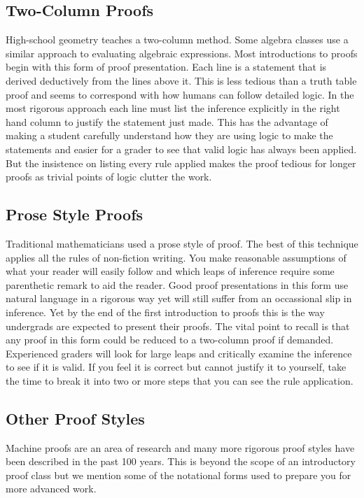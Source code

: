 \documentclass[11pt]{book} %
\theoremstyle {definition}
\theoremstyle {remark}
\begin{document}
  \subsection{Two-Column Proofs}
High-school geometry teaches a two-column method. Some algebra classes use a similar approach to evaluating algebraic expressions. Most introductions to proofs begin with this form of proof presentation. Each line is a statement that is derived deductively from the lines above it. This is less tedious than a truth table proof and seems to correspond with how humans can follow detailed logic. In the most rigorous approach each line must list the inference explicitly in the right hand column to justify the statement just made. This has the advantage of making a student carefully understand how they are using logic to make the statements and easier for a grader to see that valid logic has always been applied. But the insistence on listing every rule applied makes the proof tedious for longer proofs as trivial points of logic clutter the work.
  \subsection{Prose Style Proofs}
Traditional mathematicians used a prose style of proof. The best of this technique applies all the rules of non-fiction writing. You make reasonable assumptions of what your reader will easily follow and which leaps of inference require some parenthetic remark to aid the reader. Good proof presentations in this form use natural language in a rigorous way yet will still suffer from an occassional slip  in inference. Yet by the end of the first introduction to proofs this is the way undergrads are expected to present their proofs. The vital point to recall is that any proof in this form could be reduced to a two-column proof if demanded. Experienced graders will look for large leaps and critically examine the inference to see if it is valid. If you feel it is correct but cannot justify it to yourself, take the time to break it into two or more steps that you can see the rule application.
  \subsection{Other Proof Styles}
Machine proofs are an area of research and many more rigorous proof styles have been described in the past 100 years. This is beyond the scope of an introductory proof class but we mention some of the notational forms used to prepare you for more advanced work. 
\end{document}
